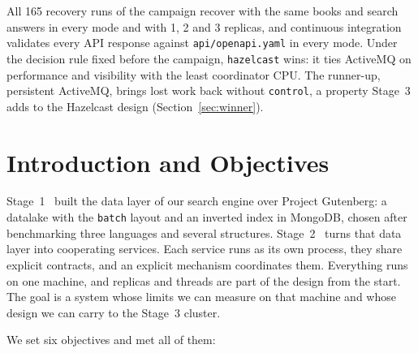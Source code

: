 \documentclass[11pt,a4paper]{article}
\newcommand{\code}[1]{\nolinkurl{#1}}
\newcommand{\mode}[1]{\code{#1}}
\begin{document}
All 165 recovery runs of the campaign recover with the same books and search answers in every mode and with 1, 2 and 3
replicas, and continuous integration validates every API response against \code{api/openapi.yaml} in every mode. Under
the decision rule fixed before the campaign, \mode{hazelcast} wins: it ties ActiveMQ on performance and visibility with
the least coordinator CPU. The runner-up, persistent ActiveMQ, brings lost work back without \code{control}, a property
Stage~3 adds to the Hazelcast design (Section~\ref{sec:winner}).

\newpage

\section{Introduction and Objectives}
\label{sec:introduction}

Stage~1~\cite{stage1} built the data layer of our search engine over Project Gutenberg: a datalake with the \code{batch} layout
and an inverted index in MongoDB, chosen after benchmarking three languages and several structures. Stage~2~\cite{assignment} turns that
data layer into cooperating services. Each service runs as its own process, they share explicit contracts, and an
explicit mechanism coordinates them. Everything runs on one machine, and replicas and threads are part of the design
from the start. The goal is a system whose limits we can measure on that machine and whose design we can carry to the
Stage~3 cluster.

We set six objectives and met all of them:
\end{document}
